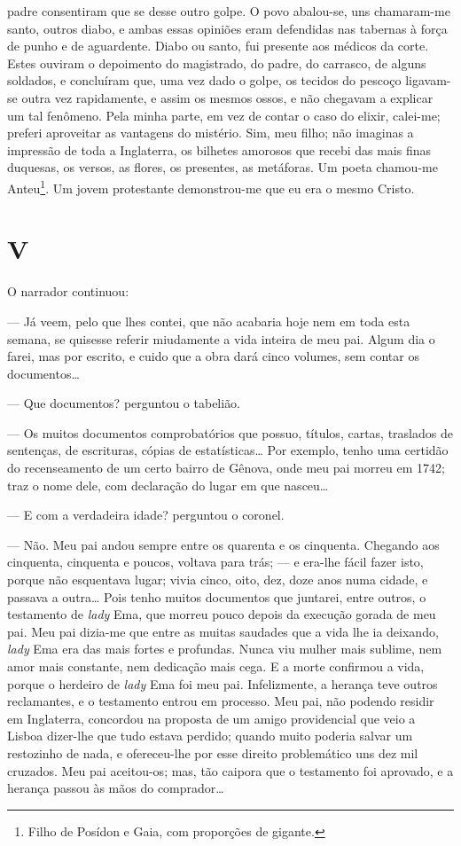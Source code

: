 padre consentiram que se desse outro golpe. O povo abalou-se, uns
chamaram-me santo, outros diabo, e ambas essas opiniões eram defendidas
nas tabernas à força de punho e de aguardente. Diabo ou santo, fui
presente aos médicos da corte. Estes ouviram o depoimento do magistrado,
do padre, do carrasco, de alguns soldados, e concluíram que, uma vez
dado o golpe, os tecidos do pescoço ligavam-se outra vez rapidamente, e
assim os mesmos ossos, e não chegavam a explicar um tal fenômeno. Pela
minha parte, em vez de contar o caso do elixir, calei-me; preferi
aproveitar as vantagens do mistério. Sim, meu filho; não imaginas a
impressão de toda a Inglaterra, os bilhetes amorosos que recebi das mais
finas duquesas, os versos, as flores, os presentes, as metáforas. Um
poeta chamou-me Anteu\footnote{Filho de Posídon e Gaia, com proporções
  de gigante.}. Um jovem protestante demonstrou-me que eu era o mesmo
Cristo.



\section{V}



O narrador continuou:

--- Já veem, pelo que lhes contei, que não acabaria hoje nem em toda
esta semana, se quisesse referir miudamente a vida inteira de meu pai.
Algum dia o farei, mas por escrito, e cuido que a obra dará cinco
volumes, sem contar os documentos\ldots{}

--- Que documentos? perguntou o tabelião.

--- Os muitos documentos comprobatórios que possuo, títulos, cartas,
traslados de sentenças, de escrituras, cópias de estatísticas\ldots{} Por
exemplo, tenho uma certidão do recenseamento de um certo bairro de
Gênova, onde meu pai morreu em 1742; traz o nome dele, com declaração do
lugar em que nasceu\ldots{}

--- E com a verdadeira idade? perguntou o coronel.

--- Não. Meu pai andou sempre entre os quarenta e os cinquenta. Chegando
aos cinquenta, cinquenta e poucos, voltava para trás; --- e era-lhe
fácil fazer isto, porque não esquentava lugar; vivia cinco, oito, dez,
doze anos numa cidade, e passava a outra\ldots{} Pois tenho muitos documentos
que juntarei, entre outros, o testamento de \emph{lady} Ema, que morreu
pouco depois da execução gorada de meu pai. Meu pai dizia-me que entre
as muitas saudades que a vida lhe ia deixando, \emph{lady} Ema era das
mais fortes e profundas. Nunca viu mulher mais sublime, nem amor mais
constante, nem dedicação mais cega. E a morte confirmou a vida, porque o
herdeiro de \emph{lady} Ema foi meu pai. Infelizmente, a herança teve
outros reclamantes, e o testamento entrou em processo. Meu pai, não
podendo residir em Inglaterra, concordou na proposta de um amigo
providencial que veio a Lisboa dizer-lhe que tudo estava perdido; quando
muito poderia salvar um restozinho de nada, e ofereceu-lhe por esse
direito problemático uns dez mil cruzados. Meu pai aceitou-os; mas, tão
caipora que o testamento foi aprovado, e a herança passou às mãos do
comprador\ldots{}

